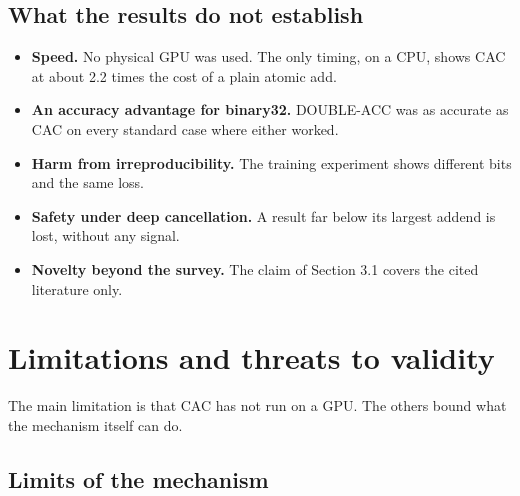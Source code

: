 \documentclass[journal]{IEEEtran}
\begin{document}
\hypertarget{what-the-results-do-not-establish}{%
\subsection{What the results do not
establish}\label{what-the-results-do-not-establish}}

\begin{itemize}
\item
  \textbf{Speed.} No physical GPU was used. The only timing, on a CPU,
  shows CAC at about 2.2 times the cost of a plain atomic add.
\item
  \textbf{An accuracy advantage for binary32.} DOUBLE-ACC was as
  accurate as CAC on every standard case where either worked.
\item
  \textbf{Harm from irreproducibility.} The training experiment shows
  different bits and the same loss.
\item
  \textbf{Safety under deep cancellation.} A result far below its
  largest addend is lost, without any signal.
\item
  \textbf{Novelty beyond the survey.} The claim of Section 3.1 covers
  the cited literature only.
\end{itemize}

\hypertarget{limitations-and-threats-to-validity}{%
\section{Limitations and threats to
validity}\label{limitations-and-threats-to-validity}}

The main limitation is that CAC has not run on a GPU. The others bound
what the mechanism itself can do.

\hypertarget{limits-of-the-mechanism}{%
\subsection{Limits of the mechanism}\label{limits-of-the-mechanism}}
\end{document}
